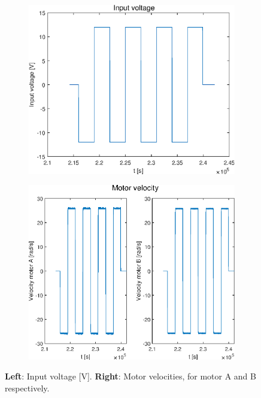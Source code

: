 \documentclass[a4paper,kul]{kulakarticle} %
\begin{document}
\begin{figure}[htp!]
	\centering
	\begin{subfigure}[b]{0.485\textwidth}
		\centering
		\includegraphics[width=\textwidth]{input_voltage.eps}
	\end{subfigure}
	\hfill
	\begin{subfigure}[b]{0.5\textwidth}  
		\centering 
		\includegraphics[width=\textwidth]{motor_velocity.eps}
	\end{subfigure}
	\caption{\textbf{Left}: Input voltage [V]. \textbf{Right}: Motor velocities, for motor A and B respectively.} 
	\label{fig:IO}
\end{figure}
\end{document}
